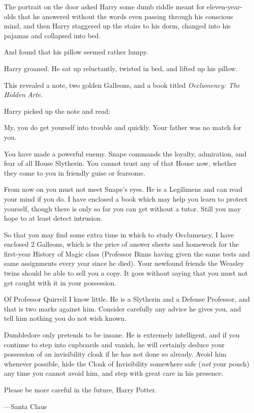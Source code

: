 The portrait on the door asked Harry some dumb riddle meant for eleven-year-olds that he answered without the words even passing through his conscious mind, and then Harry staggered up the stairs to his dorm, changed into his pajamas and collapsed into bed.

And found that his pillow seemed rather lumpy.

Harry groaned. He sat up reluctantly, twisted in bed, and lifted up his pillow.

This revealed a note, two golden Galleons, and a book titled \emph{Occlumency: The Hidden Arte.}

Harry picked up the note and read:

\begin{writtenNote}
My, you do get yourself into trouble and quickly. Your father was no match for you.

You have made a powerful enemy. Snape commands the loyalty, admiration, and fear of all House Slytherin. You cannot trust any of that House now, whether they come to you in friendly guise or fearsome.

From now on you must not meet Snape's eyes. He is a Legilimens and can read your mind if you do. I have enclosed a book which may help you learn to protect yourself, though there is only so far you can get without a tutor. Still you may hope to at least detect intrusion.

So that you may find some extra time in which to study Occlumency, I have enclosed 2 Galleons, which is the price of answer sheets and homework for the first-year History of Magic class (Professor Binns having given the same tests and same assignments every year since he died). Your newfound friends the Weasley twins should be able to sell you a copy. It goes without saying that you must not get caught with it in your possession.

Of Professor Quirrell I know little. He is a Slytherin and a Defense Professor, and that is two marks against him. Consider carefully any advice he gives you, and tell him nothing you do not wish known.

Dumbledore only pretends to be insane. He is extremely intelligent, and if you continue to step into cupboards and vanish, he will certainly deduce your possession of an invisibility cloak if he has not done so already. Avoid him whenever possible, hide the Cloak of Invisibility somewhere safe (\emph{not} your pouch) any time you cannot avoid him, and step with great care in his presence.

Please be more careful in the future, Harry Potter.

---Santa Claus
\end{writtenNote}

